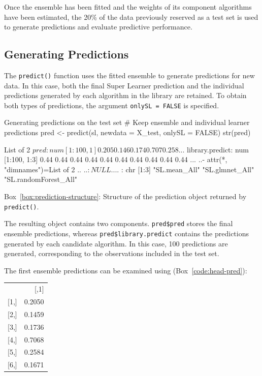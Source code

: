 \documentclass[12pt]{article}
\newcommand{\routputcaption}[2]{%
    \par\smallskip
    \begin{center}
        Box~\ref{#1}: #2
    \end{center}
}
\begin{document}
Once the ensemble has been fitted and the weights of its component algorithms have 
been estimated, the 20\% of the data previously reserved as a test set is used to 
generate predictions and evaluate predictive performance.

\subsection{Generating Predictions}

The \texttt{predict()} function uses the fitted ensemble to generate predictions for 
new data. In this case, both the final Super Learner prediction and the individual 
predictions generated by each algorithm in the library are retained. To obtain both 
types of predictions, the argument \texttt{onlySL = FALSE} is specified.

\begin{rcode}[label={code:predict}]{Generating predictions on the test set}
# Keep ensemble and individual learner predictions
pred <- predict(sl, newdata = X_test, onlySL = FALSE)
str(pred)
\end{rcode}

\begin{routputref}[label={box:prediction-structure}]
	List of 2
	$ pred           : num [1:100, 1] 0.205 0.146 0.174 0.707 0.258 ...
	$ library.predict: num [1:100, 1:3] 0.44 0.44 0.44 0.44 0.44 0.44 0.44 0.44 0.44 0.44 ...
	..- attr(*, "dimnames")=List of 2
	.. ..$ : NULL
	.. ..$ : chr [1:3] "SL.mean_All" "SL.glmnet_All" "SL.randomForest_All"
\end{routputref}

\routputcaption{box:prediction-structure}{Structure of the prediction object returned by \texttt{predict()}.}

The resulting object contains two components. \texttt{pred\$pred} stores the final 
ensemble predictions, whereas \texttt{pred\$library.predict} contains the predictions 
generated by each candidate algorithm. In this case, 100 predictions are generated, 
corresponding to the observations included in the test set.

The first ensemble predictions can be examined using (Box~\ref{code:head-pred}):


\begin{routputboxref}[label={box:ensemble-predictions}]
	\ttfamily
	\centering
	\begin{tabular}{lr}
		& {[,1]} \\
		{[1,]} & 0.2050 \\
		{[2,]} & 0.1459 \\
		{[3,]} & 0.1736 \\
		{[4,]} & 0.7068 \\
		{[5,]} & 0.2584 \\
		{[6,]} & 0.1671 \\
	\end{tabular}
\end{routputboxref}
\end{document}
